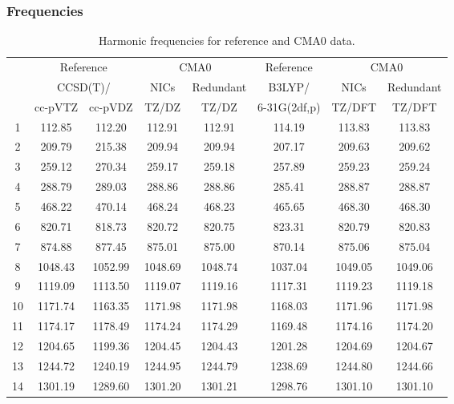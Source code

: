 \documentclass[10pt,oneside]{article}
\begin{document}
\begin{table}[h!]
\subsubsection*{Frequencies}
\centering
\caption{Harmonic frequencies for reference and CMA0 data.}
\begin{tabular}{cccccccc}
\toprule
{} & \multicolumn{2}{c}{Reference} & \multicolumn{2}{c}{CMA0} &    Reference & \multicolumn{2}{c}{CMA0} \\
{} & \multicolumn{2}{c}{CCSD(T)/} &    NICs &  Redundant &       B3LYP/ &    NICs & Redundant \\
{} &   cc-pVTZ & cc-pVDZ &   TZ/DZ &      TZ/DZ & 6-31G(2df,p) &  TZ/DFT &    TZ/DFT \\
\midrule
1  &    112.85 &  112.20 &  112.91 &     112.91 &       114.19 &  113.83 &    113.83 \\
2  &    209.79 &  215.38 &  209.94 &     209.94 &       207.17 &  209.63 &    209.62 \\
3  &    259.12 &  270.34 &  259.17 &     259.18 &       257.89 &  259.23 &    259.24 \\
4  &    288.79 &  289.03 &  288.86 &     288.86 &       285.41 &  288.87 &    288.87 \\
5  &    468.22 &  470.14 &  468.24 &     468.23 &       465.65 &  468.30 &    468.30 \\
6  &    820.71 &  818.73 &  820.72 &     820.75 &       823.31 &  820.79 &    820.83 \\
7  &    874.88 &  877.45 &  875.01 &     875.00 &       870.14 &  875.06 &    875.04 \\
8  &   1048.43 & 1052.99 & 1048.69 &    1048.74 &      1037.04 & 1049.05 &   1049.06 \\
9  &   1119.09 & 1113.50 & 1119.07 &    1119.16 &      1117.31 & 1119.23 &   1119.18 \\
10 &   1171.74 & 1163.35 & 1171.98 &    1171.98 &      1168.03 & 1171.96 &   1171.98 \\
11 &   1174.17 & 1178.49 & 1174.24 &    1174.29 &      1169.48 & 1174.16 &   1174.20 \\
12 &   1204.65 & 1199.36 & 1204.45 &    1204.43 &      1201.28 & 1204.69 &   1204.67 \\
13 &   1244.72 & 1240.19 & 1244.95 &    1244.79 &      1238.69 & 1244.80 &   1244.66 \\
14 &   1301.19 & 1289.60 & 1301.20 &    1301.21 &      1298.76 & 1301.10 &   1301.10 \\

\end{tabular}
\end{table}
\end{document}
